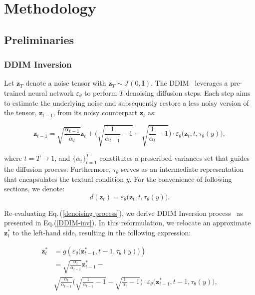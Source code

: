 \documentclass[letterpaper]{article} \usepackage{aaai25}  \usepackage{times}  \usepackage{helvet}  \usepackage{courier}  \usepackage[hyphens]{url}  \usepackage{graphicx} \urlstyle{rm} \def\UrlFont{\rm}  \usepackage{natbib}  \usepackage{caption} \frenchspacing  \setlength{\pdfpagewidth}{8.5in} \setlength{\pdfpageheight}{11in} \usepackage{algorithm}
\begin{document}
\section{Methodology}
\label{methods}

\subsection{Preliminaries}

\subsubsection{DDIM Inversion}
\label{sec:ddim_inv}

Let \(\mathbf{z}_T\) denote a noise tensor with \(\mathbf{z}_T \sim \mathcal{I}(0, \mathbf{I})\). The DDIM~\cite{couairon2023diffedit} leverages a pre-trained neural network \(\varepsilon_{\theta}\) to perform \(T\) denoising diffusion steps. Each step aims to estimate the underlying noise and subsequently restore a less noisy version of the tensor, \(\mathbf{z}_{t-1}\), from its noisy counterpart \(\mathbf{z}_t\) as:
\begin{small}
\begin{equation}
\label{denoising process}
    \mathbf{z}_{t-1} = \sqrt{\frac{\alpha_{t-1}}{\alpha_t}}\mathbf{z}_t + \Bigg(\sqrt{\frac{1}{\alpha_{t-1}} - 1} - \sqrt{\frac{1}{\alpha_t} - 1} \Bigg)\cdot \varepsilon_{\theta}\big(\mathbf{z}_t,t,\tau_{\theta}(y)\big),
\end{equation}
\end{small}
where \( t = T \rightarrow 1\), and \( \{\alpha_t\}_{t=1}^T \) constitutes a prescribed variances set that guides the diffusion process. Furthermore, \( \tau_{\theta} \) serves as an intermediate representation that encapsulates the textual condition \( y \).  For the convenience of following sections, we denote:
\begin{equation}\label{eq:noise}
  d(\mathbf{z}_t) = \varepsilon_{\theta}\big(\mathbf{z}_t,t,\tau_{\theta}(y)\big).   
\end{equation}



Re-evaluating Eq.\,(\ref{denoising process}), we derive DDIM Inversion process~\cite{couairon2023diffedit} as presented in Eq.(\ref{DDIM-inv}). In this reformulation, we relocate an approximate $\mathbf{z}^*_t$ to the left-hand side, resulting in the following expression:
\begin{small}
\begin{equation}
\label{DDIM-inv}
\begin{split}
\mathbf{z}^*_t &= g\left(\varepsilon_{\theta}\big(\mathbf{z}^*_{t-1},t-1,\tau_{\theta}(y)\big)\right) \\&= \sqrt{\frac{\alpha_{t}}{\alpha_{t-1}}}\mathbf{z}^*_{t-1} -\\& \sqrt{\frac{\alpha_{t}}{\alpha_{t-1}}}\Bigg(\sqrt{\frac{1}{\alpha_{t-1}} - 1} - \sqrt{\frac{1}{\alpha_t} - 1} \Bigg) \cdot \varepsilon_{\theta}\big(\mathbf{z}^*_{t-1},t-1,\tau_{\theta}(y)\big),
\end{split}
\end{equation}
\end{small}
\end{document}

